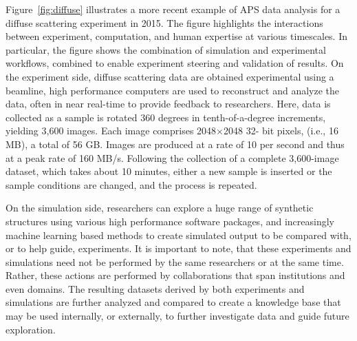 \documentclass{aip-cp}
\begin{document}
Figure~\ref{fig:diffuse} illustrates a more recent example of APS data analysis
for a diffuse scattering experiment in 2015. 
The figure highlights the interactions between experiment, computation, and human expertise
at various timescales. In particular, the figure shows the combination of simulation and 
experimental workflows, combined to enable experiment steering and validation of results.
On the experiment side, diffuse scattering data are obtained experimental using a beamline, 
high performance computers are used to reconstruct and analyze the data, often in
near real-time to provide feedback to researchers.  Here, data is collected
as a sample is rotated 360 degrees in tenth-of-a-degree increments, yielding
3,600 images. Each image comprises 2048$\times$2048 32-
bit pixels, (i.e., 16 MB), a total of 56 GB. Images are
produced at a rate of 10 per second and thus at a peak rate of
160 MB/s. Following the collection of a complete 3,600-image
dataset, which takes about 10 minutes, either a new sample
is inserted or the sample conditions are changed,
and the process is repeated. 


On the simulation side, researchers can explore a huge range of synthetic structures
using various high performance software packages, and increasingly machine learning
based methods to create simulated output to be compared with, or to help guide, experiments. 
It is important to note, that these experiments and simulations need not be performed
by the same researchers or at the same time. Rather, these actions are performed by
collaborations that span institutions and even domains. 
The resulting datasets derived by both experiments and simulations are further analyzed
and compared to create a knowledge base that may be used internally, or externally, 
to further investigate data and guide future exploration.
\end{document}
